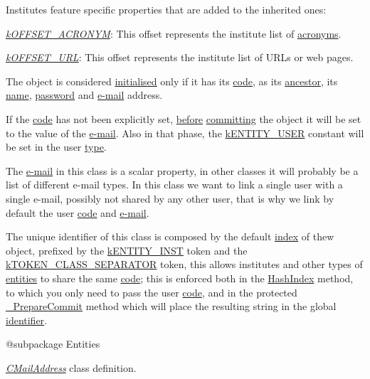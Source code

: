 Institutes feature specific properties that are added to the inherited ones\-:


\begin{DoxyItemize}
\item {\itshape \hyperlink{}{k\-O\-F\-F\-S\-E\-T\-\_\-\-A\-C\-R\-O\-N\-Y\-M}}\-: This offset represents the institute list of \hyperlink{}{acronyms}. 
\item {\itshape \hyperlink{}{k\-O\-F\-F\-S\-E\-T\-\_\-\-U\-R\-L}}\-: This offset represents the institute list of U\-R\-Ls or web pages. 
\end{DoxyItemize}

The object is considered \hyperlink{}{initialised} only if it has its \hyperlink{}{code}, as its \hyperlink{class_c_entity}{ancestor}, its \hyperlink{}{name}, \hyperlink{}{password} and \hyperlink{}{e-\/mail} address.

If the \hyperlink{}{code} has not been explicitly set, \hyperlink{}{before} \hyperlink{}{committing} the object it will be set to the value of the \hyperlink{}{e-\/mail}. Also in that phase, the \hyperlink{}{k\-E\-N\-T\-I\-T\-Y\-\_\-\-U\-S\-E\-R} constant will be set in the user \hyperlink{}{type}.

The \hyperlink{}{e-\/mail} in this class is a scalar property, in other classes it will probably be a list of different e-\/mail types. In this class we want to link a single user with a single e-\/mail, possibly not shared by any other user, that is why we link by default the user \hyperlink{}{code} and \hyperlink{}{e-\/mail}.

The unique identifier of this class is composed by the default \hyperlink{}{index} of thew object, prefixed by the \hyperlink{}{k\-E\-N\-T\-I\-T\-Y\-\_\-\-I\-N\-S\-T} token and the \hyperlink{}{k\-T\-O\-K\-E\-N\-\_\-\-C\-L\-A\-S\-S\-\_\-\-S\-E\-P\-A\-R\-A\-T\-O\-R} token, this allows institutes and other types of \hyperlink{class_c_entity}{entities} to share the same \hyperlink{}{code}; this is enforced both in the \hyperlink{}{Hash\-Index} method, to which you only need to pass the user \hyperlink{}{code}, and in the protected \hyperlink{}{\-\_\-\-Prepare\-Commit} method which will place the resulting string in the global \hyperlink{}{identifier}.

\begin{DoxyVerb} @subpackage        Entities\end{DoxyVerb}


{\itshape \hyperlink{class_c_mail_address}{C\-Mail\-Address}} class definition.

